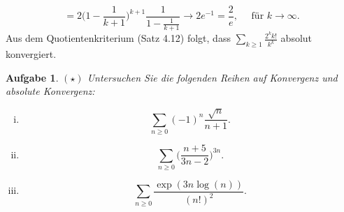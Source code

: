 \documentclass[a4paper, 20]{exam}
\newtheorem{ex}{Aufgabe}
\begin{document}
\begin{solution}
\begin{enumerate}[i.)]
$$ = 2 \bigg(1-\frac{1}{k+1}\bigg)^{k+1} \frac{1}{1-\frac{1}{k+1}} \longrightarrow 2 e^{-1} = \frac{2}{e}, \quad \text{ f\"ur } k \longrightarrow \infty.$$
Aus dem Quotientenkriterium (Satz 4.12) folgt, dass $\sum_{k\geq 1} \frac{2^k k!}{k^k}$ absolut konvergiert.
\end{enumerate}
\end{solution}


 
\begin{ex}{$(\star)$}
Untersuchen Sie die folgenden Reihen auf Konvergenz und absolute Konvergenz:

\begin{enumerate}[i.)]
\item
$$ \sum_{n\geq 0} (-1)^n \frac{\sqrt{n}}{n+1}.$$

\item
$$ \sum_{n\geq 0} \bigg( \frac{n+5}{3n-2} \bigg)^{3n}.$$

\item
$$ \sum_{n\geq 0} \frac{\exp(3n \log(n))}{(n!)^2}.$$
\end{enumerate}
\end{ex}
\end{document}
